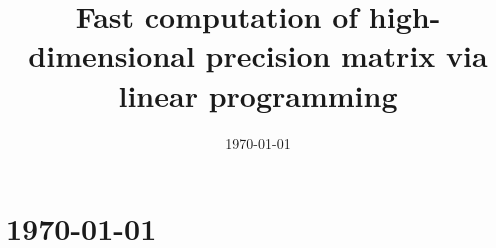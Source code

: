 \documentclass[12pt]{report}
\title{Fast computation of high-dimensional precision matrix via linear programming}
\author{}
\date{\today}
\begin{document}
\maketitle
\tableofcontents

\chapter{\today}




\end{document}
